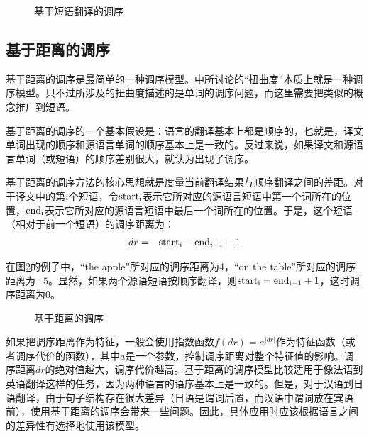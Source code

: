 \begin{figure}[htp]
\centering

\caption{基于短语翻译的调序}
\label{fig:7-19}
\end{figure}


\subsection{基于距离的调序}

\parinterval 基于距离的调序是最简单的一种调序模型。{\chaptersix}中所讨论的“扭曲度”本质上就是一种调序模型。只不过{\chaptersix}所涉及的扭曲度描述的是单词的调序问题，而这里需要把类似的概念推广到短语。

\parinterval 基于距离的调序的一个基本假设是：语言的翻译基本上都是顺序的，也就是，译文单词出现的顺序和源语言单词的顺序基本上是一致的。反过来说，如果译文和源语言单词（或短语）的顺序差别很大，就认为出现了调序。

\parinterval 基于距离的调序方法的核心思想就是度量当前翻译结果与顺序翻译之间的差距。对于译文中的第$i$个短语，令$\rm{start}_i$表示它所对应的源语言短语中第一个词所在的位置，$\rm{end}_i$表示它所对应的源语言短语中最后一个词所在的位置。于是，这个短语（相对于前一个短语）的调序距离为：
\begin{eqnarray}
dr & = & {\rm{start}}_i-{\rm{end}}_{i-1}-1
\label{eq:7-15}
\end{eqnarray}

\parinterval 在图\ref{fig:7-20}的例子中，“the apple”所对应的调序距离为4，“on the table”所对应的调序距离为$-5$。显然，如果两个源语短语按顺序翻译，则$\rm{start}_i = \rm{end}_{i-1} + 1$，这时调序距离为0。

\begin{figure}[htp]
\centering

\caption{基于距离的调序}
\label{fig:7-20}
\end{figure}

\parinterval 如果把调序距离作为特征，一般会使用指数函数$f(dr) = a^{|dr|}$作为特征函数（或者调序代价的函数），其中$a$是一个参数，控制调序距离对整个特征值的影响。调序距离$dr$的绝对值越大，调序代价越高。基于距离的调序模型比较适用于像法语到英语翻译这样的任务，因为两种语言的语序基本上是一致的。但是，对于汉语到日语翻译，由于句子结构存在很大差异（日语是谓词后置，而汉语中谓词放在宾语前），使用基于距离的调序会带来一些问题。因此，具体应用时应该根据语言之间的差异性有选择地使用该模型。

